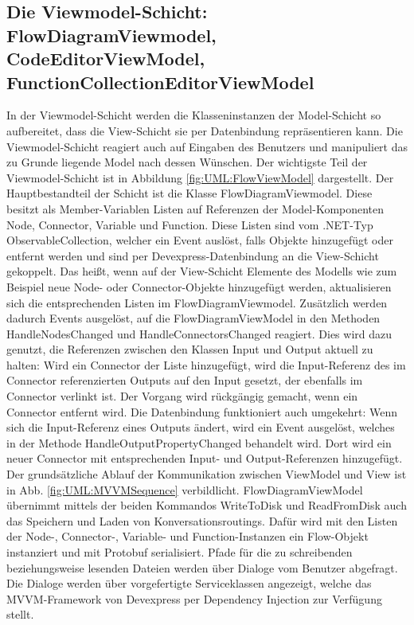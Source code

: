 \subsection[Die Viewmodel-Schicht]{Die Viewmodel-Schicht: FlowDiagramViewmodel, CodeEditorViewModel, FunctionCollectionEditorViewModel}
\label{subsec:Die Viewmodel-Schicht}
In der Viewmodel-Schicht werden die Klasseninstanzen der Model-Schicht so aufbereitet, dass die View-Schicht sie per Datenbindung repräsentieren kann. Die Viewmodel-Schicht reagiert auch auf Eingaben des Benutzers und manipuliert das zu Grunde liegende Model nach dessen Wünschen. Der wichtigste Teil der Viewmodel-Schicht ist in Abbildung \ref{fig:UML:FlowViewModel} dargestellt.  
\newline
Der Hauptbestandteil der Schicht ist die Klasse FlowDiagramViewmodel. Diese besitzt als Member-Variablen Listen auf Referenzen der Model-Komponenten Node, Connector, Variable und Function. Diese Listen sind vom .NET-Typ ObservableCollection, welcher ein Event auslöst, falls Objekte hinzugefügt oder entfernt werden und sind per Devexpress-Datenbindung an die View-Schicht gekoppelt. Das heißt, wenn auf der View-Schicht Elemente des Modells wie zum Beispiel neue Node- oder Connector-Objekte hinzugefügt werden, aktualisieren sich die entsprechenden Listen im FlowDiagramViewmodel. Zusätzlich werden dadurch Events ausgelöst, auf die FlowDiagramViewModel in den Methoden HandleNodesChanged und HandleConnectorsChanged reagiert. Dies wird dazu genutzt, die Referenzen zwischen den Klassen Input und Output aktuell zu halten: Wird ein Connector der Liste hinzugefügt, wird die Input-Referenz des im Connector referenzierten Outputs auf den Input gesetzt, der ebenfalls im Connector verlinkt ist. Der Vorgang wird rückgängig gemacht, wenn ein Connector entfernt wird. Die Datenbindung funktioniert auch umgekehrt: Wenn sich die Input-Referenz eines Outputs ändert, wird ein Event ausgelöst, welches in der Methode HandleOutputPropertyChanged behandelt wird. Dort wird ein neuer Connector mit entsprechenden Input- und Output-Referenzen hinzugefügt. Der grundsätzliche Ablauf der Kommunikation zwischen ViewModel und View ist in Abb. \ref{fig:UML:MVVMSequence} verbildlicht.
\newline 
FlowDiagramViewModel übernimmt mittels der beiden Kommandos WriteToDisk und ReadFromDisk auch das Speichern und Laden von Konversationsroutings. Dafür wird mit den Listen der Node-, Connector-, Variable- und Function-Instanzen ein Flow-Objekt instanziert und mit Protobuf serialisiert. Pfade für die zu schreibenden beziehungsweise lesenden Dateien werden über Dialoge vom Benutzer abgefragt. Die Dialoge werden über vorgefertigte Serviceklassen angezeigt, welche das MVVM-Framework von Devexpress per Dependency Injection zur Verfügung stellt. 
